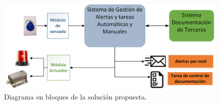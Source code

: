 \begin{figure}[ht]
	\centering
	\includegraphics[width=1\textwidth]{./Figures/solucionbasica.png}
	\caption{Diagrama en bloques de la solución propuesta.}
	\label{fig:Solucionbasica}
\end{figure}



